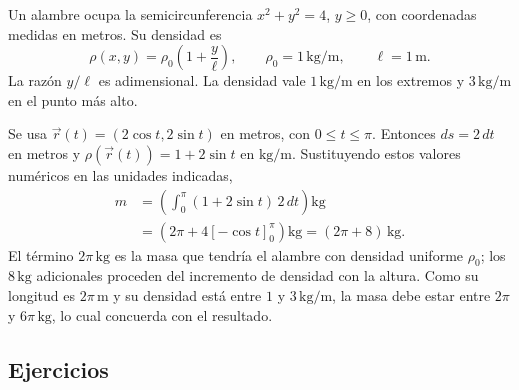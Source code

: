 Un alambre ocupa la semicircunferencia $x^2+y^2=4$, $y\geq0$, con coordenadas medidas en metros. Su densidad es
\[
\rho(x,y)=\rho_0\left(1+\frac{y}{\ell}\right),
\qquad \rho_0=1\,\mathrm{kg}/\mathrm{m},\qquad \ell=1\,\mathrm{m}.
\]
La razón $y/\ell$ es adimensional. La densidad vale $1\,\mathrm{kg}/\mathrm{m}$ en los extremos y $3\,\mathrm{kg}/\mathrm{m}$ en el punto más alto.

\begingroup
\shorthandoff{>}
\begin{center}
\end{center}
\endgroup

Se usa $\vec r(t)=(2\cos t,2\sin t)$ en metros, con $0\leq t\leq\pi$. Entonces $ds=2\,dt$ en metros y $\rho(\vec r(t))=1+2\sin t$ en $\mathrm{kg}/\mathrm m$. Sustituyendo estos valores numéricos en las unidades indicadas,
\begin{align*}
m&=\left(\int_0^\pi(1+2\sin t)\,2\,dt\right)\mathrm{kg}\\
&=\left(2\pi+4[-\cos t]_0^\pi\right)\mathrm{kg}
=(2\pi+8)\,\mathrm{kg}.
\end{align*}
El término $2\pi\,\mathrm{kg}$ es la masa que tendría el alambre con densidad uniforme $\rho_0$; los $8\,\mathrm{kg}$ adicionales proceden del incremento de densidad con la altura. Como su longitud es $2\pi\,\mathrm m$ y su densidad está entre $1$ y $3\,\mathrm{kg}/\mathrm m$, la masa debe estar entre $2\pi$ y $6\pi\,\mathrm{kg}$, lo cual concuerda con el resultado.

\subsection{Ejercicios}

